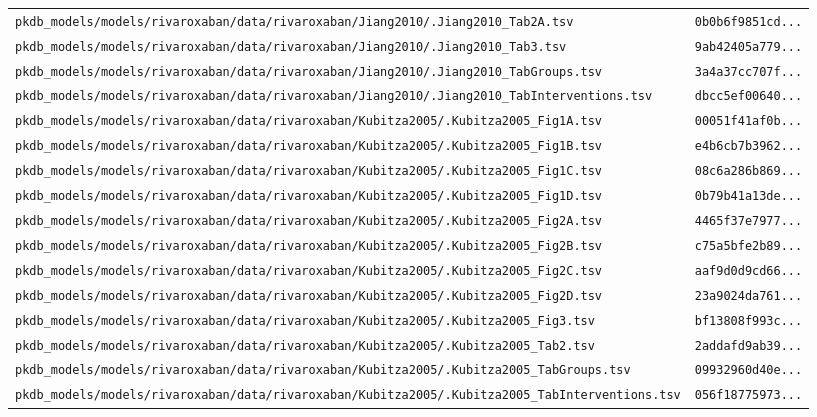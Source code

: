 \begin{longtable}{ll}
\texttt{pkdb\_models/models/rivaroxaban/data/rivaroxaban/Jiang2010/.Jiang2010\_Tab2A.tsv} & \texttt{0b0b6f9851cd...} \\
\texttt{pkdb\_models/models/rivaroxaban/data/rivaroxaban/Jiang2010/.Jiang2010\_Tab3.tsv} & \texttt{9ab42405a779...} \\
\texttt{pkdb\_models/models/rivaroxaban/data/rivaroxaban/Jiang2010/.Jiang2010\_TabGroups.tsv} & \texttt{3a4a37cc707f...} \\
\texttt{pkdb\_models/models/rivaroxaban/data/rivaroxaban/Jiang2010/.Jiang2010\_TabInterventions.tsv} & \texttt{dbcc5ef00640...} \\
\texttt{pkdb\_models/models/rivaroxaban/data/rivaroxaban/Kubitza2005/.Kubitza2005\_Fig1A.tsv} & \texttt{00051f41af0b...} \\
\texttt{pkdb\_models/models/rivaroxaban/data/rivaroxaban/Kubitza2005/.Kubitza2005\_Fig1B.tsv} & \texttt{e4b6cb7b3962...} \\
\texttt{pkdb\_models/models/rivaroxaban/data/rivaroxaban/Kubitza2005/.Kubitza2005\_Fig1C.tsv} & \texttt{08c6a286b869...} \\
\texttt{pkdb\_models/models/rivaroxaban/data/rivaroxaban/Kubitza2005/.Kubitza2005\_Fig1D.tsv} & \texttt{0b79b41a13de...} \\
\texttt{pkdb\_models/models/rivaroxaban/data/rivaroxaban/Kubitza2005/.Kubitza2005\_Fig2A.tsv} & \texttt{4465f37e7977...} \\
\texttt{pkdb\_models/models/rivaroxaban/data/rivaroxaban/Kubitza2005/.Kubitza2005\_Fig2B.tsv} & \texttt{c75a5bfe2b89...} \\
\texttt{pkdb\_models/models/rivaroxaban/data/rivaroxaban/Kubitza2005/.Kubitza2005\_Fig2C.tsv} & \texttt{aaf9d0d9cd66...} \\
\texttt{pkdb\_models/models/rivaroxaban/data/rivaroxaban/Kubitza2005/.Kubitza2005\_Fig2D.tsv} & \texttt{23a9024da761...} \\
\texttt{pkdb\_models/models/rivaroxaban/data/rivaroxaban/Kubitza2005/.Kubitza2005\_Fig3.tsv} & \texttt{bf13808f993c...} \\
\texttt{pkdb\_models/models/rivaroxaban/data/rivaroxaban/Kubitza2005/.Kubitza2005\_Tab2.tsv} & \texttt{2addafd9ab39...} \\
\texttt{pkdb\_models/models/rivaroxaban/data/rivaroxaban/Kubitza2005/.Kubitza2005\_TabGroups.tsv} & \texttt{09932960d40e...} \\
\texttt{pkdb\_models/models/rivaroxaban/data/rivaroxaban/Kubitza2005/.Kubitza2005\_TabInterventions.tsv} & \texttt{056f18775973...} \\

\end{longtable}
